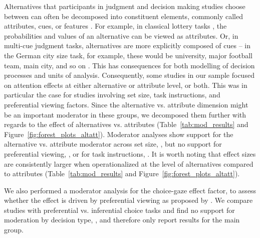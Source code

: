 Alternatives that participants in judgment and decision making studies choose between can often be decomposed into constituent elements, commonly called attributes, cues, or features \citep{payne1988,tversky1972elimination,stojic2020s,gigerenzer1996reasoning,schulz2018putting,hogarth2007heuristic}. For example, in classical lottery tasks \citep{tversky1979}, the probabilities and values of an alternative can be viewed as attributes. Or, in multi-cue judgment tasks, alternatives are more explicitly composed of cues -- in the German city size task, for example, these would be university, major football team, main city, and so on \citep{gigerenzer1996reasoning}. This has consequences for both modelling of decision processes and units of analysis. Consequently, some studies in our sample focused on attention effects at either alternative or attribute level, or both. This was in particular the case for studies involving set size, task instructions, and preferential viewing factors. Since the alternative vs. attribute dimension might be an important moderator in these groups, we decomposed them further with regards to the effect of alternatives vs. attributes (Table~\ref{tab:mod_results} and Figure~\ref{fig:forest_plots_altatt}). Moderator analyses show support for the alternative vs. attribute moderator across set size, \unskip, but no support for preferential viewing, \unskip, or for task instructions, \unskip. It is worth noting that effect sizes are consistently larger when operationalized at the level of alternatives compared to attributes (Table~\ref{tab:mod_results} and Figure~\ref{fig:forest_plots_altatt}). 

We also performed a moderator analysis for the choice-gaze effect factor, to assess whether the effect is driven by preferential viewing as proposed by \cite{shimojo2003a}. We compare studies with preferential vs. inferential choice tasks and find no support for moderation by decision type, \unskip, and therefore only report results for the main group. 




